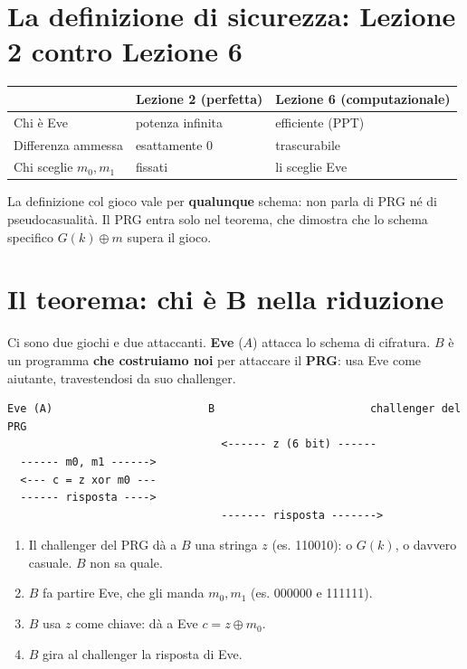 \section{La definizione di sicurezza: Lezione 2 contro Lezione 6}

\begin{center}
\begin{tabular}{lll}
\toprule
 & Lezione 2 (perfetta) & Lezione 6 (computazionale) \\
\midrule
Chi è Eve & potenza infinita & efficiente (PPT) \\
Differenza ammessa & esattamente 0 & trascurabile \\
Chi sceglie \(m_0, m_1\) & fissati & li sceglie Eve \\
\bottomrule
\end{tabular}
\end{center}

\begin{nota}
La definizione col gioco vale per \textbf{qualunque} schema: non parla di PRG né di pseudocasualità. Il PRG entra solo nel teorema, che dimostra che lo schema specifico \(G(k) \oplus m\) supera il gioco.
\end{nota}

\section{Il teorema: chi è B nella riduzione}

\begin{inbreve}
Ci sono due giochi e due attaccanti. \textbf{Eve} (\(A\)) attacca lo schema di cifratura. \(B\) è un programma \textbf{che costruiamo noi} per attaccare il \textbf{PRG}: usa Eve come aiutante, travestendosi da suo challenger.
\end{inbreve}

\begin{verbatim}
Eve (A)                        B                        challenger del PRG
                                 <------ z (6 bit) ------
  ------ m0, m1 ------>
  <--- c = z xor m0 ---
  ------ risposta ---->
                                 ------- risposta ------->
\end{verbatim}

\begin{enumerate}
  \item Il challenger del PRG dà a \(B\) una stringa \(z\) (es. 110010): o \(G(k)\), o davvero casuale. \(B\) non sa quale.
  \item \(B\) fa partire Eve, che gli manda \(m_0, m_1\) (es. 000000 e 111111).
  \item \(B\) usa \(z\) come chiave: dà a Eve \(c = z \oplus m_0\).
  \item \(B\) gira al challenger la risposta di Eve.
\end{enumerate}

